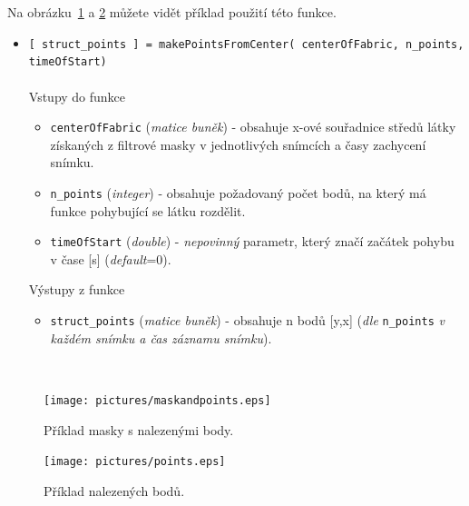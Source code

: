 \documentclass[10pt,a4paper,titlepage,oneside]{report}
\newcommand{\red}[1]{\textbf{\rlap{\color{red}#1}}}
\begin{document}
Na obrázku~\ref{fig:pointsmaskPic} a \ref{fig:pointsPic} můžete vidět příklad použití této funkce.

\begin{itemize}
  	\item \verb|[ struct_points ] = makePointsFromCenter( centerOfFabric, n_points, timeOfStart)|\\
\\
    		Vstupy do funkce
        		\begin{itemize}
  			\item \verb|centerOfFabric| (\textit{matice buněk}) - obsahuje x-ové souřadnice středů látky získaných z filtrové masky v jednotlivých snímcích a časy zachycení snímku.
  			\item \verb|n_points| (\textit{integer}) - obsahuje požadovaný počet bodů, na který má funkce pohybující se látku rozdělit.
  			\item \verb|timeOfStart| (\textit{double}) - \textit{nepovinný} parametr, který značí začátek pohybu v čase [s] (\textit{default}=0). 
    			\end{itemize}
    		Výstupy z funkce
        		\begin{itemize}
  			\item \verb|struct_points| (\textit{matice buněk}) - obsahuje n bodů [y,x] (\textit{dle} \verb|n_points| \textit{v každém snímku a čas záznamu snímku}).
    			\end{itemize}
    \end{itemize}
\red{Zde vložit popis}\\

\begin{figure}[H]
	\centering  	
  	\texttt{[image: pictures/maskandpoints.eps]}
  	\caption[]{Příklad masky s nalezenými body.	
  	}
  	\label{fig:pointsmaskPic}
\end{figure}

\begin{figure}[H]
	\centering  	
  	\texttt{[image: pictures/points.eps]}
  	\caption[]{Příklad nalezených bodů.  	
  	}
  	\label{fig:pointsPic}
\end{figure}


\end{document}
